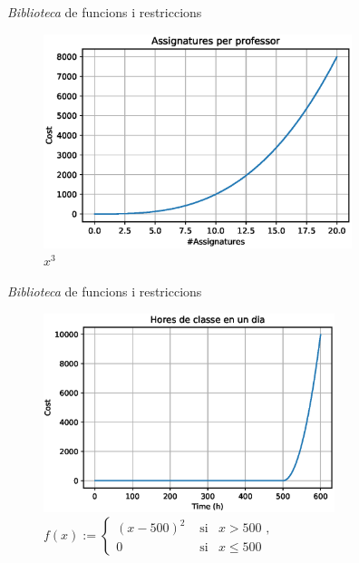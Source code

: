 \documentclass[twocolumn]{beamer}
\begin{document}
\begin{frame}{\textit{Biblioteca} de funcions i restriccions}
\begin{figure}
	\includegraphics[width=9cm]{Assignatures}
	\caption{$x^3$}
\end{figure}
\end{frame}

\begin{frame}{\textit{Biblioteca} de funcions i restriccions}
\begin{figure}
	\includegraphics[width=8.5cm]{hores_dia}
	\caption{
	$f(x):=\left\lbrace 
	\begin{matrix}
		(x-500)^2& \text{ si}& x>500\text{ ,} \\
		0& \text{ si}& x\leq 500& \end{matrix}
	\right.$
	}
\end{figure}
\end{frame}
\end{document}
